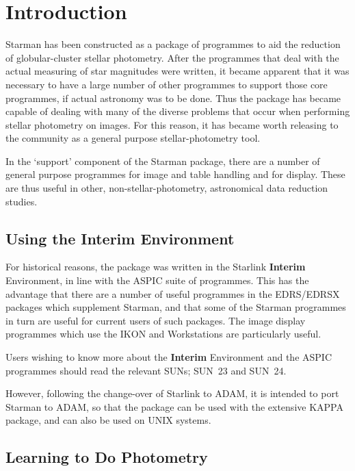 \newpage


\section{Introduction}

Starman has been constructed as a package of programmes to aid the reduction of
globular-cluster stellar photometry. After the programmes that deal with
the actual measuring of star magnitudes were written, it became apparent
that it was necessary to have a large number of other programmes to support
those core programmes, if actual astronomy was to be done. Thus the package
has became capable of dealing with many of the diverse problems that occur
when performing stellar photometry on images. For this reason,
it has became worth releasing to the community as a general purpose
stellar-photometry tool. 

In the `support' component of the Starman package, there are a number of
general purpose programmes for image and table handling and for display.
These are thus useful in other, non-stellar-photometry, astronomical data
reduction studies. 

\subsection{Using the Interim Environment}

For historical reasons, the package was written in the Starlink {\bf Interim} 
Environment, in line with the ASPIC suite of programmes. This has the
advantage that there are a number of useful programmes in the 
EDRS/EDRSX packages which supplement Starman, and that some of
the Starman programmes in turn are useful for current users of such
packages. The image display programmes which use the IKON and Workstations
are particularly useful.

Users wishing to know more about the {\bf Interim} Environment and the
ASPIC programmes should read the relevant SUNs; SUN~23 and SUN~24. 

However, following the change-over of Starlink to ADAM, it is intended to
port Starman to ADAM, so that the package can be used with the extensive
KAPPA package, and can also be used on UNIX systems. 

\subsection{Learning to Do Photometry}

